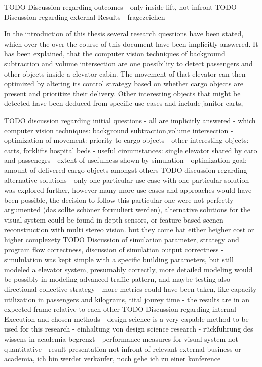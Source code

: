 TODO Discussion regarding outcomes
- only inside lift, not infront
TODO Discussion regarding external Results - fragezeichen

In the introduction of this thesis several research questions have been stated,
which over the over the course of this document have been implicitly answered.
It has been explained, that the computer vision techniques of background subtraction and volume intersection are one possibility to detect passengers and other objects inside a elevator cabin. The movement of that elevator can then optimized by altering its control strategy based on whether cargo objects are present and prioritize their delivery.
Other interesting objects that might be detected have been deduced from specific use cases and include janitor carts, 

TODO discussion regarding initial questions
 - all are implicitly answered
 - which computer vision techniques: background subtraction,volume intersection
 - optimization of movement: priority to cargo objects
 - other interesting objects: carts, forklifts hospital beds
 - useful circumstances: single elevator shared by caro and passenegrs
 - extent of usefulness shown by simulation
 - optimization goal: amount of delivered cargo objects amongst others
TODO discussion regarding alternative solutions
 - only one particular use case with one particular solution was explored further, however many more use cases and approaches would have been possible, the decision to follow this particular one were not perfectly argumented (das sollte schöner formuliert werden), alternative solutions for the visual system could be found in depth sensors, or feature based scenen reconstruction with multi stereo vision. but they come hat either heigher cost or higher complexety
TODO Discussion of simulation parameter, strategy and program flow correctness, discussion of simulation output correctness
- simululation was kept simple with a specific building parameters, but still modeled a elevator system, presumably correctly, more detailed modeling would be possibly in modeling advanced traffic pattern, and maybe testing also directional collective strategy
- more metrics could have been taken, like capacity utilization in passengers and kilograms, tital jourey time
- the results are in an expected frame relative to each other
TODO  Discussion regarding internal Execution and chosen methods 
- design science is a very capable method to be used for this research
- einhaltung von design science research - rückführung des wissens in academia begrenzt
- performance measures for visual system not quantitative
- result presentation not infront of relevant external business or academia, ich bin werder verkäufer, noch gehe ich zu einer konference

